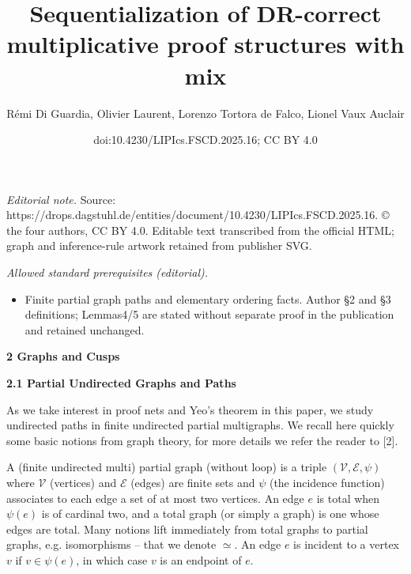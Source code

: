 \documentclass[10pt,a4paper]{amsart}
\title{Sequentialization of DR-correct multiplicative proof structures with mix}
\author{Rémi Di Guardia, Olivier Laurent, Lorenzo Tortora de Falco, Lionel Vaux Auclair}
\date{doi:10.4230/LIPIcs.FSCD.2025.16; CC BY 4.0}
\begin{document}
\maketitle
\noindent\textit{Editorial note.} Source: https://drops.dagstuhl.de/entities/document/10.4230/LIPIcs.FSCD.2025.16. © the four authors, CC BY 4.0. Editable text transcribed from the official HTML; graph and inference-rule artwork retained from publisher SVG.\par\medskip
\noindent\textit{Allowed standard prerequisites (editorial).}\begin{itemize}
\item Finite partial graph paths and elementary ordering facts. Author §2 and §3 definitions; Lemmas4/5 are stated without separate proof in the publication and retained unchanged.
\end{itemize}\medskip
 
\par\medskip\noindent\textbf{2 Graphs and Cusps}\par
 
 
\par\medskip\noindent\textbf{2.1 Partial Undirected Graphs and Paths}\par
 
 
As we take interest in proof nets and Yeo’s theorem in this paper, we study undirected paths in finite undirected partial multigraphs. We recall here quickly some basic notions from graph theory, for more details we refer the reader to [2].\par
 
 
 
A (finite undirected multi) partial graph (without loop) is a triple $(\mathcal{V},\mathcal{E},\psi)$ where $\mathcal{V}$ (vertices) and $\mathcal{E}$ (edges) are finite sets and $\psi$ (the incidence function) associates to each edge a set of at most two vertices. An edge $e$ is total when $\psi(e)$ is of cardinal two, and a total graph (or simply a graph) is one whose edges are total. Many notions lift immediately from total graphs to partial graphs, e.g. isomorphisms – that we denote $\simeq$. An edge $e$ is incident to a vertex $v$ if $v\in\psi(e)$, in which case $v$ is an endpoint of $e$.\par
 
 
\end{document}
